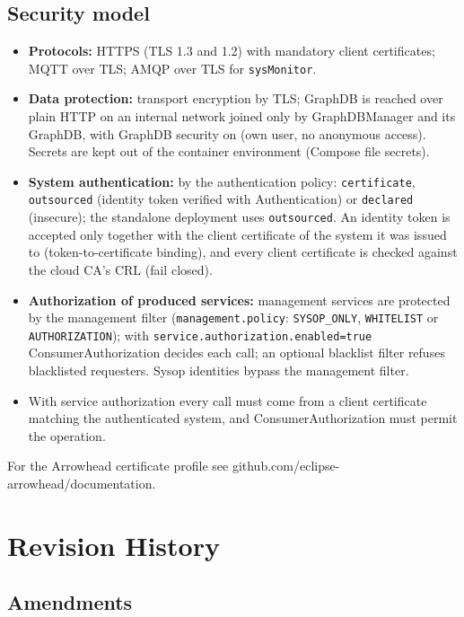 \documentclass[a4paper]{arrowhead}
\begin{document}
\subsection{Security model}


\begin{itemize}
  \item \textbf{Protocols:} HTTPS (TLS 1.3 and 1.2) with mandatory client certificates; MQTT over TLS; AMQP over TLS for \texttt{sysMonitor}.
  \item \textbf{Data protection:} transport encryption by TLS; GraphDB is reached over plain HTTP on an internal network joined only by GraphDBManager and its GraphDB, with GraphDB security on (own user, no anonymous access). Secrets are kept out of the container environment (Compose file secrets).
  \item \textbf{System authentication:} by the authentication policy: \texttt{certificate}, \texttt{outsourced} (identity token verified with Authentication) or \texttt{declared} (insecure); the standalone deployment uses \texttt{outsourced}. An identity token is accepted only together with the client certificate of the system it was issued to (token-to-certificate binding), and every client certificate is checked against the cloud CA's CRL (fail closed).
  \item \textbf{Authorization of produced services:} management services are protected by the management filter (\texttt{management.policy}: \texttt{SYSOP\_ONLY}, \texttt{WHITELIST} or \texttt{AUTHORIZATION}); with \texttt{service.authorization.enabled=true} ConsumerAuthorization decides each call; an optional blacklist filter refuses blacklisted requesters. Sysop identities bypass the management filter.
  \item With service authorization every call must come from a client certificate matching the authenticated system, and Consumer\allowbreak{}Authorization must permit the operation.
\end{itemize}

For the Arrowhead certificate profile see github.com/eclipse-arrowhead/documentation.





\newpage

\section{Revision History}
\subsection{Amendments}
\end{document}
